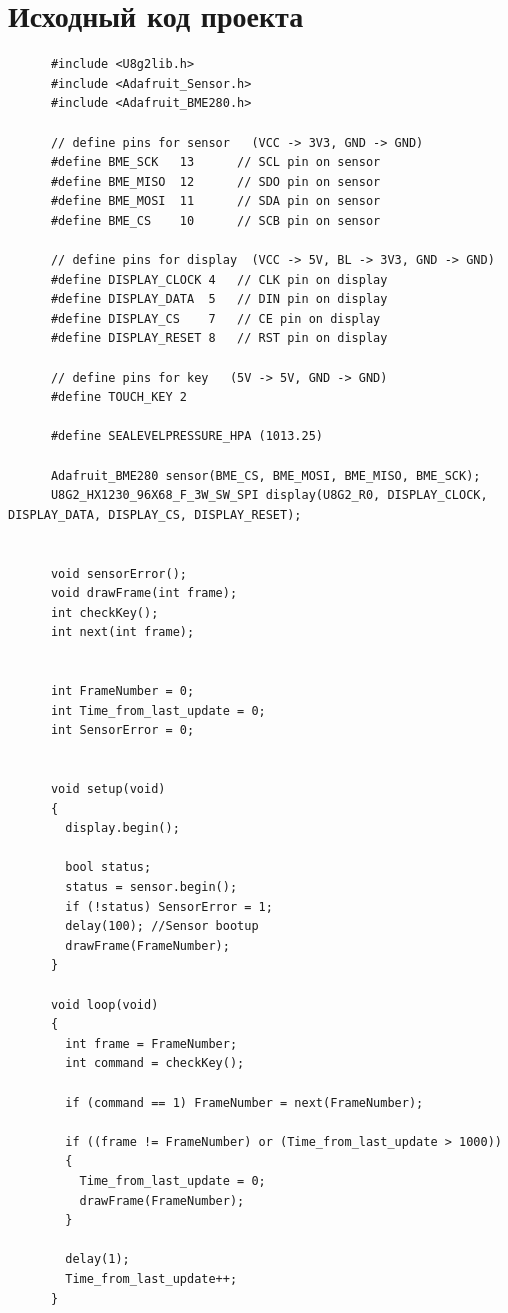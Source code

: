 \documentclass[12pt]{article}
\begin{document}
  \section{Исходный код проекта}
    \begin{verbatim}
      #include <U8g2lib.h>
      #include <Adafruit_Sensor.h>
      #include <Adafruit_BME280.h>

      // define pins for sensor   (VCC -> 3V3, GND -> GND)
      #define BME_SCK   13      // SCL pin on sensor
      #define BME_MISO  12      // SDO pin on sensor
      #define BME_MOSI  11      // SDA pin on sensor
      #define BME_CS    10      // SCB pin on sensor

      // define pins for display  (VCC -> 5V, BL -> 3V3, GND -> GND)
      #define DISPLAY_CLOCK 4   // CLK pin on display
      #define DISPLAY_DATA  5   // DIN pin on display
      #define DISPLAY_CS    7   // CE pin on display
      #define DISPLAY_RESET 8   // RST pin on display

      // define pins for key   (5V -> 5V, GND -> GND)
      #define TOUCH_KEY 2

      #define SEALEVELPRESSURE_HPA (1013.25)

      Adafruit_BME280 sensor(BME_CS, BME_MOSI, BME_MISO, BME_SCK);
      U8G2_HX1230_96X68_F_3W_SW_SPI display(U8G2_R0, DISPLAY_CLOCK, DISPLAY_DATA, DISPLAY_CS, DISPLAY_RESET);


      void sensorError();
      void drawFrame(int frame);
      int checkKey();
      int next(int frame);


      int FrameNumber = 0;
      int Time_from_last_update = 0;
      int SensorError = 0;


      void setup(void)
      {
        display.begin();

        bool status;
        status = sensor.begin();
        if (!status) SensorError = 1;
        delay(100); //Sensor bootup
        drawFrame(FrameNumber);
      }

      void loop(void)
      {
        int frame = FrameNumber;
        int command = checkKey();

        if (command == 1) FrameNumber = next(FrameNumber);

        if ((frame != FrameNumber) or (Time_from_last_update > 1000))
        {
          Time_from_last_update = 0;
          drawFrame(FrameNumber);
        }

        delay(1);
        Time_from_last_update++;
      }



\end{verbatim}
\end{document}
